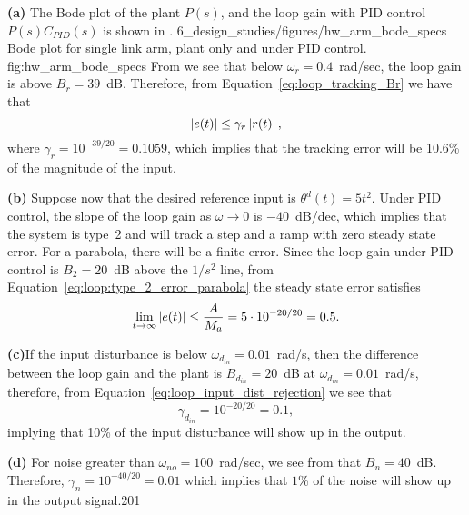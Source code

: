 {\bf (a)} The Bode plot of the plant $P(s)$, and the loop gain with PID control $P(s)C_{PID}(s)$ is shown in .
	{6_design_studies/figures/hw_arm_bode_specs}
	{Bode plot for single link arm, plant only and under PID control.}
	{fig:hw_arm_bode_specs}
From  we see that below $\omega_r = 0.4$~rad/sec, the loop gain is above $B_r=39$~dB.  Therefore, from Equation~\eqref{eq:loop_tracking_Br} we have that
\[
\left|e(t)\right| \leq \gamma_r \left|r(t)\right|,
\]
where $\gamma_r = 10^{-39/20} = 0.1059$, which implies that the tracking error will be 10.6\% of the magnitude of the input.


{\bf (b)} Suppose now that the desired reference input is $\theta^d(t) = 5t^2$.  Under PID control, the slope of the loop gain as $\omega\to 0$ is $-40$~dB/dec, which implies that the system is type~2 and will track a step and a ramp with zero steady state error.  For a parabola, there will be a finite error.  Since the loop gain under PID control is $B_2=20$~dB above the $1/s^2$ line, from Equation~\eqref{eq:loop:type_2_error_parabola} the steady state error satisfies
\[
\lim_{t\to\infty}\left|e(t)\right| \leq \frac{A}{M_a}  = 5\cdot 10^{-20/20} = 0.5.
\]

{\bf (c)}If the input disturbance is below $\omega_{d_{in}} = 0.01$~rad/s, then the difference between the loop gain and the plant is $B_{d_{in}}=20$~dB at $\omega_{d_{in}} = 0.01$~rad/s, therefore, from Equation~\eqref{eq:loop_input_dist_rejection} we see that 
\[
\gamma_{d_{in}} = 10^{-20/20} = 0.1,
\]
implying that 10\% of the input disturbance will show up in the output.

{\bf (d)} For noise greater than $\omega_{no}=100$~rad/sec, we see from  that $B_n = 40$~dB.  Therefore, $\gamma_n = 10^{-40/20} = 0.01$ which implies that $1$\% of the noise will show up in the output signal.201
